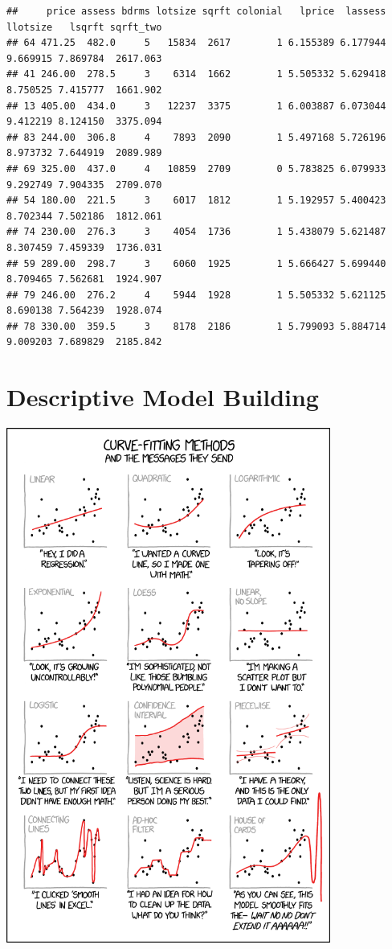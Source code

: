 \documentclass[
]{book}
\theoremstyle{definition}
\theoremstyle{definition}
\theoremstyle{definition}
\theoremstyle{definition}
\theoremstyle{remark}
\begin{document}
\begin{verbatim}
##     price assess bdrms lotsize sqrft colonial   lprice  lassess llotsize   lsqrft sqrft_two
## 64 471.25  482.0     5   15834  2617        1 6.155389 6.177944 9.669915 7.869784  2617.063
## 41 246.00  278.5     3    6314  1662        1 5.505332 5.629418 8.750525 7.415777  1661.902
## 13 405.00  434.0     3   12237  3375        1 6.003887 6.073044 9.412219 8.124150  3375.094
## 83 244.00  306.8     4    7893  2090        1 5.497168 5.726196 8.973732 7.644919  2089.989
## 69 325.00  437.0     4   10859  2709        0 5.783825 6.079933 9.292749 7.904335  2709.070
## 54 180.00  221.5     3    6017  1812        1 5.192957 5.400423 8.702344 7.502186  1812.061
## 74 230.00  276.3     3    4054  1736        1 5.438079 5.621487 8.307459 7.459339  1736.031
## 59 289.00  298.7     3    6060  1925        1 5.666427 5.699440 8.709465 7.562681  1924.907
## 79 246.00  276.2     4    5944  1928        1 5.505332 5.621125 8.690138 7.564239  1928.074
## 78 330.00  359.5     3    8178  2186        1 5.799093 5.884714 9.009203 7.689829  2185.842
\end{verbatim}

\hypertarget{descriptive-model-building}{%
\chapter{Descriptive Model Building}\label{descriptive-model-building}}

\includegraphics[width=0.8\textwidth,height=\textheight]{./images/curve_fitting.png}
\end{document}
